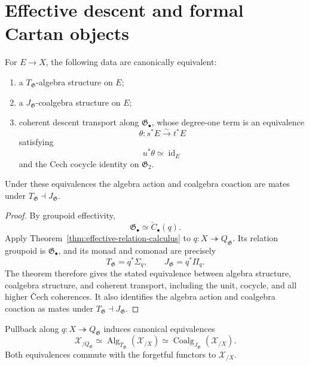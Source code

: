 \section{Effective descent and formal Cartan objects}
\label{sec:flg-descent}

\begin{theorem}
\label{thm:formal-groupoid-transport-mates}
For $E\to X$, the following data are canonically equivalent:
\begin{enumerate}
    \item a $T_{\mathfrak G}$-algebra structure on $E$;
    \item a $J_{\mathfrak G}$-coalgebra structure on $E$;
    \item coherent descent transport along $\mathfrak G_\bullet$, whose
    degree-one term is an equivalence
    \[
        \theta:s^*E\xrightarrow{\sim}t^*E
    \]
    satisfying
    \[
        u^*\theta\simeq\operatorname{id}_E
    \]
    and the Cech cocycle identity on $\mathfrak G_2$.
\end{enumerate}
Under these equivalences the algebra action and coalgebra coaction are mates
under
$T_{\mathfrak G}\dashv J_{\mathfrak G}$.
\end{theorem}

\begin{proof}
By groupoid effectivity,
\[
    \mathfrak G_\bullet
    \simeq
    \check C_\bullet(q).
\]
Apply Theorem~\ref{thm:effective-relation-calculus} to
$q:X\twoheadrightarrow Q_{\mathfrak G}$.  Its relation groupoid is
$\mathfrak G_\bullet$, and its monad and comonad are precisely
\[
    T_{\mathfrak G}=q^*\Sigma_q,
    \qquad
    J_{\mathfrak G}=q^*\Pi_q.
\]
The theorem therefore gives the stated equivalence between algebra structure,
coalgebra structure, and coherent transport, including the unit, cocycle, and
all higher \v{C}ech coherences.  It also identifies the algebra action and
coalgebra coaction as mates under
$T_{\mathfrak G}\dashv J_{\mathfrak G}$.
\end{proof}

\begin{theorem}
\label{thm:formal-groupoid-effective-descent}
Pullback along $q:X\twoheadrightarrow Q_{\mathfrak G}$ induces canonical
equivalences
\[
    \mathcal X_{/Q_{\mathfrak G}}
    \simeq
    \operatorname{Alg}_{T_{\mathfrak G}}(\mathcal X_{/X})
    \simeq
    \operatorname{Coalg}_{J_{\mathfrak G}}(\mathcal X_{/X}).
\]
Both equivalences commute with the forgetful functors to
$\mathcal X_{/X}$.
\end{theorem}

